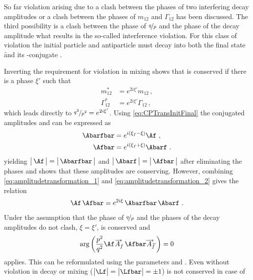 So far \CP violation arising due to a clash between the phases of two interfering decay amplitudes or a clash between the phases of $m_{12}$ and $\Gamma_{12}$ has been discussed.
The third possibility is a clash between the phase of $\nicefrac{q}{p}$ and the phase of the decay amplitude what results in the so-called interference \CP violation.
For this class of \CP violation the initial particle \Paz and antiparticle \Pazb must decay into both the final state \f and its \CP-conjugate \fbar.

Inverting the requirement for \CP violation in mixing shows that \CP is conserved if there is a phase $\xi'$ such that
\begin{equation}
\begin{split}
m_{12}^\ast &= e^{2i\xi'}m_{12}\,,\\
\Gamma_{12}^\ast &= e^{2i\xi'}\Gamma_{12}\,,\label{eq:CPconservationMixing}
\end{split}
\end{equation}
which leads directly to $\nicefrac{q^2}{p^2} = e^{2i\xi'}$.
Using \cref{eq:CPTransInitFinal} the \CP conjugated amplitudes \Abarfbar and \Afbar can be expressed as
\begin{align}
\Abarfbar&=e^{i\left(\xi_f-\xi\right)}\Af\,\,,\label{eq:amplitudetransformation_1}\\
\Afbar&=e^{i\left(\xi_f+\xi\right)}\Abarf\,\,.\label{eq:amplitudetransformation_2}
\end{align}
yielding $\big|\,\Af\,\big|=\big|\,\Abarfbar\,\big|$ and $\big|\,\Abarf\,\big|=\big|\,\Afbar\,\big|$ after eliminating the phases and shows that these amplitudes are \CP conserving.
However, combining \cref{eq:amplitudetransformation_1} and \cref{eq:amplitudetransformation_2} gives the relation
\begin{equation}
\Af\,\Afbar=e^{2i\xi}\,\Abarfbar\,\Abarf\,\,.
\end{equation}
Under the assumption that the phase of $\nicefrac{q}{p}$ and the phases of the decay amplitudes do not clash, \ie $\xi=\xi'$, \CP is conserved and
\begin{equation}
\arg\left(\frac{p^2}{q^2}\Af \,\overline{\kern -1.0pt A\kern -1.0pt}_{\kern 1.0pt f}^\ast\,\Afbar\overline{\kern -1.0pt \,A\kern -1.0pt}_{\kern 2.5pt\overline{\kern -1.5pt f\kern 1.5pt}}^\ast\right)=0
\end{equation}
applies.
This can be reformulated using the parameters \Lf and \Lfbar.
Even without \CP violation in decay or mixing ($\big|\Lf\big|=\big|\Lfbar\big| = \pm1$) \CP is not conserved in case of
